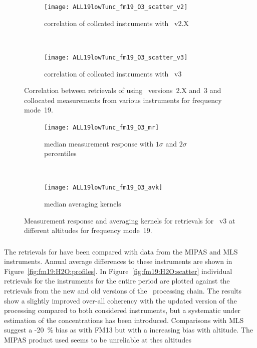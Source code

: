 \begin{figure}[tbhp]
    \centering
    \begin{subfigure}[b]{0.49\textwidth}
        \texttt{[image: ALL19lowTunc\_fm19\_O3\_scatter\_v2]}
        \caption{correlation of collcated instruments with \smr~v2.X}
        \label{fig:fm19:O3:scatter:v2}
    \end{subfigure}
    \,
    \begin{subfigure}[b]{0.49\textwidth}
        \texttt{[image: ALL19lowTunc\_fm19\_O3\_scatter\_v3]}
        \caption{correlation of collcated instruments with \smr~v3}
        \label{fig:fm19:O3:scatter:v3}
    \end{subfigure}
    \caption{Correlation between retrievals of  using \smr\
    versions~2.X and~3 and collocated measurements from various instruments
    for frequency mode~19.}
    \label{fig:fm19:O3:scatter}
\end{figure}

\begin{figure}[tbhp]
    \centering
    \begin{subfigure}[b]{0.49\textwidth}
        \texttt{[image: ALL19lowTunc\_fm19\_O3\_mr]}
        \caption{median measurement response with $1\sigma$ and $2\sigma$
        percentiles}
        \label{fig:fm19:O3:mr}
    \end{subfigure}
    \,
    \begin{subfigure}[b]{0.49\textwidth}
        \texttt{[image: ALL19lowTunc\_fm19\_O3\_avk]}
        \caption{median averaging kernels\newline~}
        \label{fig:fm19:O3:avk}
    \end{subfigure}
    \caption{Measurement response and averaging kernels for 
    retrievals for \smr~v3 at different altitudes for frequency mode~19.}
    \label{fig:fm19:O3:mr_avk}
\end{figure}



\subsubsection{}
\label{sec:fm19:comparison:H2O}
The retrievals for \chem{H_2O} have been compared with data from the MIPAS and
MLS instruments.  Annual average differences to these instruments are shown in
Figure~\ref{fig:fm19:H2O:profiles}. In Figure~\ref{fig:fm19:H2O:scatter}
individual retrievals for the instruments for the entire period are plotted
against the retrievals from the new and old versions of the \smr\ processing
chain. The results show a slightly improved over-all coherency with the
updated version of the processing compared to both considered instruments, but
a systematic under estimation of the concentrations has been introduced.
Comparisons with MLS suggest a -20~\% bias as with FM13 but with a increasing
bias with altitude.  The MIPAS product used seems to be unreliable at thes
altitudes


